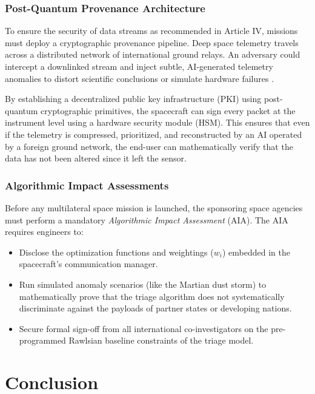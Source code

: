 \documentclass[final,5p,times,twocolumn]{elsarticle}
\begin{document}
\subsubsection{Post-Quantum Provenance Architecture}

To ensure the security of data streams as recommended in Article IV, missions must deploy a cryptographic provenance pipeline. Deep space telemetry travels across a distributed network of international ground relays. An adversary could intercept a downlinked stream and inject subtle, AI-generated telemetry anomalies to distort scientific conclusions or simulate hardware failures \citep{schmitt2023securing}.

By establishing a decentralized public key infrastructure (PKI) using post-quantum cryptographic primitives, the spacecraft can sign every packet at the instrument level using a hardware security module (HSM). This ensures that even if the telemetry is compressed, prioritized, and reconstructed by an AI operated by a foreign ground network, the end-user can mathematically verify that the data has not been altered since it left the sensor.

\subsubsection{Algorithmic Impact Assessments}

Before any multilateral space mission is launched, the sponsoring space agencies must perform a mandatory \textit{Algorithmic Impact Assessment} (AIA). The AIA requires engineers to:
\begin{itemize}
\item Disclose the optimization functions and weightings ($w_i$) embedded in the spacecraft's communication manager.
\item Run simulated anomaly scenarios (like the Martian dust storm) to mathematically prove that the triage algorithm does not systematically discriminate against the payloads of partner states or developing nations.
\item Secure formal sign-off from all international co-investigators on the pre-programmed Rawlsian baseline constraints of the triage model.
\end{itemize}

\section{Conclusion}
\label{sec:conclusion}
\end{document}
